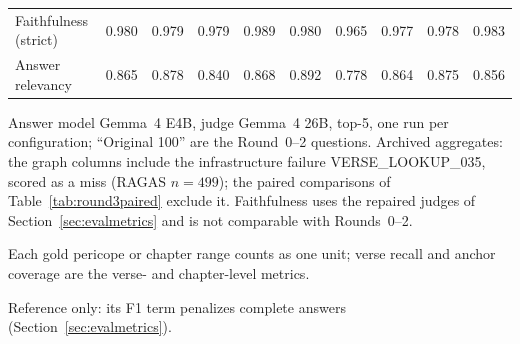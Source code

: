 \begin{table}[!t]
\begin{threeparttable}
\begin{tabular}{@{}lccccccccc@{}}
Faithfulness (strict) & 0.980 & 0.979 & 0.979 & 0.989 & 0.980 & 0.965 & 0.977 & 0.978 & 0.983 \\
Answer relevancy & 0.865 & 0.878 & 0.840 & 0.868 & 0.892 & 0.778 & 0.864 & 0.875 & 0.856 \\
\bottomrule
\end{tabular}
\begin{tablenotes}\footnotesize
\item Answer model Gemma~4 E4B, judge Gemma~4 26B, top-5, one run per
configuration; ``Original 100'' are the Round~0--2 questions. Archived
aggregates: the graph columns include the infrastructure failure
VERSE\_LOOKUP\_035, scored as a miss (RAGAS $n=499$); the paired
comparisons of Table~\ref{tab:round3paired} exclude it. Faithfulness uses
the repaired judges of Section~\ref{sec:evalmetrics} and is not
comparable with Rounds~0--2.
\item[a] Each gold pericope or chapter range counts as one unit; verse
recall and anchor coverage are the verse- and chapter-level metrics.
\item[b] Reference only: its F1 term penalizes complete answers
(Section~\ref{sec:evalmetrics}).
\end{tablenotes}
\end{threeparttable}
\end{table}

